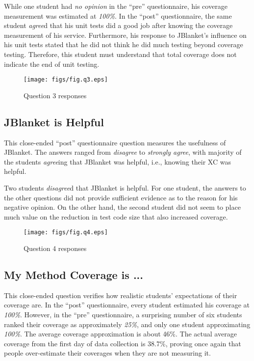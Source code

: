 While one student had {\sl no opinion} in the ``pre'' questionnaire, his
coverage measurement was estimated at {\sl 100\%}.  In the ``post''
questionnaire, the same student {\sl agree}d that his unit tests did a good
job after knowing the coverage measurement of his service.  Furthermore,
his response to JBlanket's influence on his unit tests stated that he did
not think he did much testing beyond coverage testing.  Therefore, this
student must understand that total coverage does not indicate the end of
unit testing.

\begin{figure}[htbp]
  \centering
  \texttt{[image: figs/fig.q3.eps]}
  \caption{Question 3 responses}
  \label{fig:q3}
\end{figure}

\subsection{JBlanket is Helpful}
This close-ended ``post'' questionnaire question measures the usefulness of
JBlanket.  The answers ranged from {\sl disagree} to {\sl strongly agree},
with majority of the students {\sl agree}ing that JBlanket was helpful,
i.e., knowing their XC was helpful.

Two students {\sl disagree}d that JBlanket is helpful.  For one student,
the answers to the other questions did not provide sufficient evidence as
to the reason for his negative opinion.  On the other hand, the second
student did not seem to place much value on the reduction in test code size
that also increased coverage.

\begin{figure}[htbp]
  \centering
  \texttt{[image: figs/fig.q4.eps]}
  \caption{Question 4 responses}
  \label{fig:q4}
\end{figure}

\subsection{My Method Coverage is ...}
This close-ended question verifies how realistic students' expectations of
their coverage are.  In the ``post'' questionnaire, every student estimated
his coverage at {\sl 100\%}.  However, in the ``pre'' questionnaire, a
surprising number of six students ranked their coverage as approximately
{\sl 25\%}, and only one student approximating {\sl 100\%}.  The average
coverage approximation is about 46\%.  The actual average coverage from the
first day of data collection is 38.7\%, proving once again that people
over-estimate their coverages when they are not measuring it.

